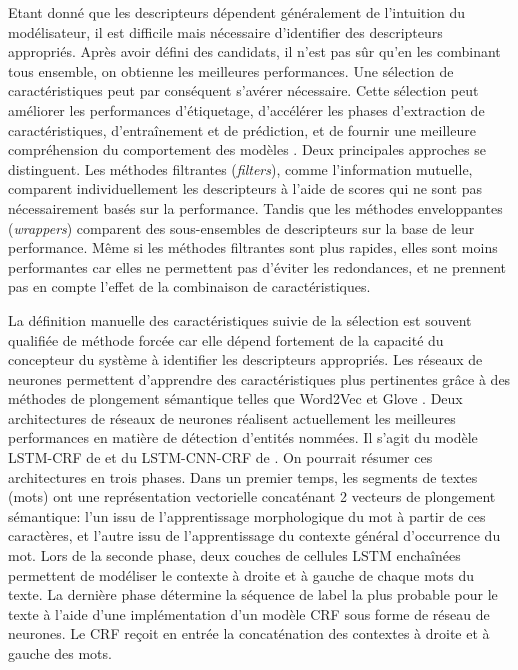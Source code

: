 Etant donné que les descripteurs dépendent généralement de l'intuition du modélisateur, il est difficile mais nécessaire d'identifier des descripteurs appropriés. Après avoir défini des candidats, il n'est pas sûr qu'en les combinant tous ensemble, on obtienne les meilleures performances. Une sélection de caractéristiques peut par conséquent s'avérer nécessaire. Cette sélection peut améliorer les performances d'étiquetage, d'accélérer les phases d'extraction de caractéristiques, d'entraînement et de prédiction, et de fournir une meilleure compréhension du comportement des modèles \citep{kitoogo2007featureSelectNER, klinger2009FeaturefilterCRF}. Deux principales approches se distinguent. Les méthodes \og filtrantes \fg{} (\textit{filters}), comme l'information mutuelle, comparent individuellement les descripteurs à l'aide de scores qui ne sont pas nécessairement basés sur la performance. Tandis que les méthodes \og enveloppantes \fg{} (\textit{wrappers}) comparent des sous-ensembles de descripteurs sur la base de leur performance. Même si les méthodes filtrantes sont plus rapides, elles sont moins performantes car elles ne permettent pas d'éviter les redondances, et ne prennent pas en compte l'effet de la combinaison de caractéristiques.

La définition manuelle des caractéristiques suivie de la sélection est souvent qualifiée de méthode forcée car elle dépend fortement de la capacité du concepteur du système à identifier les descripteurs appropriés. Les réseaux de neurones permettent d'apprendre des caractéristiques plus pertinentes grâce à des méthodes de plongement sémantique telles que Word2Vec \citep{lemikolov2014word2vec} et Glove \citep{pennington2014glove}.  Deux architectures de réseaux de neurones réalisent actuellement les meilleures performances en matière de détection d'entités nommées. Il s'agit du modèle LSTM-CRF de  \citet{lample2016nnner} et du LSTM-CNN-CRF de \citet{ma2016lstm-cnns-crf}. On pourrait résumer ces architectures en trois phases. Dans un premier temps, les segments de textes (mots) ont une représentation vectorielle concaténant 2 vecteurs de plongement sémantique: l'un issu de l'apprentissage morphologique du mot à partir de ces caractères, et l'autre issu de l'apprentissage du contexte général d'occurrence du mot. Lors de la seconde phase, deux couches de cellules LSTM enchaînées permettent de modéliser le contexte à droite et à gauche de chaque mots du texte. La dernière phase détermine la séquence de label la plus probable pour le texte à l'aide d'une implémentation d'un modèle CRF sous forme de réseau de neurones. Le CRF reçoit en entrée la concaténation des contextes à droite et à gauche des mots.

